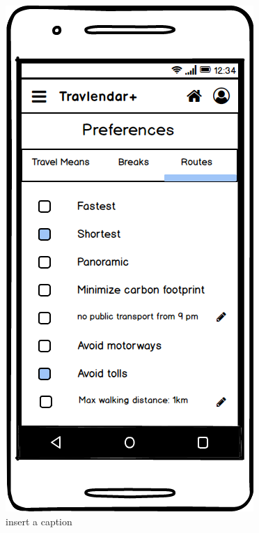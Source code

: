 \documentclass[11pt]{article}
\begin{document}
	\begin{figure}
		\centering
		\includegraphics[width=0.7\linewidth]{PreferencesRoutes.png}
		\caption{insert a caption}
		\label{fig:preferencesroutes}
	\end{figure}
	
\end{document}
